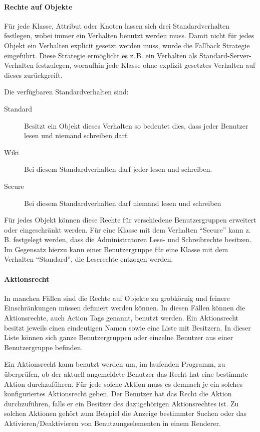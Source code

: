 \paragraph{Rechte auf Objekte}
Für jede Klasse, Attribut oder Knoten lassen sich drei Standardverhalten festlegen, wobei immer ein Verhalten benutzt werden muss.
Damit nicht für jedes Objekt ein Verhalten explicit gesetzt werden muss, wurde die Fallback Strategie eingeführt.
Diese Strategie ermöglicht es z.\,B. ein Verhalten als Standard-Server-Verhalten festzulegen, woraufhin jede Klasse ohne explizit gesetztes Verhalten auf dieses zurückgreift.

Die verfügbaren Standardverhalten sind:
\begin{description}
\item[Standard] Besitzt ein Objekt dieses Verhalten so bedeutet dies, dass jeder Benutzer lesen und niemand schreiben darf.
\item[Wiki] Bei diesem Standardverhalten darf jeder lesen und schreiben.
\item[Secure] Bei diesem Standardverhalten darf niemand lesen und schreiben
\end{description}
Für jedes Objekt können diese Rechte für verschiedene Benutzergruppen erweitert oder eingeschränkt werden.
Für eine Klasse mit dem Verhalten "`Secure"' kann z.\,B. festgelegt werden, dass die Administratoren Lese- und Schreibrechte besitzen.
Im Gegensatz hierzu kann einer Benutzergruppe für eine Klasse mit dem Verhalten "`Standard"', die Leserechte entzogen werden. \autocite[vgl.][]{cismet-workshop}

\paragraph{Aktionsrecht}
In manchen Fällen sind die Rechte auf Objekte zu grobkörnig und feinere Einschränkungen müssen definiert werden können.
In diesen Fällen können die Aktionsrechte, auch Action Tags genannt, benutzt werden.
Ein Aktionsrecht besitzt jeweils einen eindeutigen Namen sowie eine Liste mit Besitzern.
In dieser Liste können sich ganze Benutzergruppen oder einzelne Benutzer aus einer Benutzergruppe befinden.

Ein Aktionsrecht kann benutzt werden um, im laufenden Programm, zu überprüfen, ob der aktuell angemeldete Benutzer das Recht hat eine bestimmte Aktion durchzuführen.
Für jede solche Aktion muss es demnach je ein solches konfiguriertes Aktionsrecht geben.
Der Benutzer hat das Recht die Aktion durchzuführen, falls er ein Besitzer des dazugehörigen Aktionsrechtes ist.
Zu solchen Aktionen gehört zum Beispiel die Anzeige bestimmter Suchen oder das Aktivieren/Deaktivieren von Benutzungselementen in einem Renderer.

